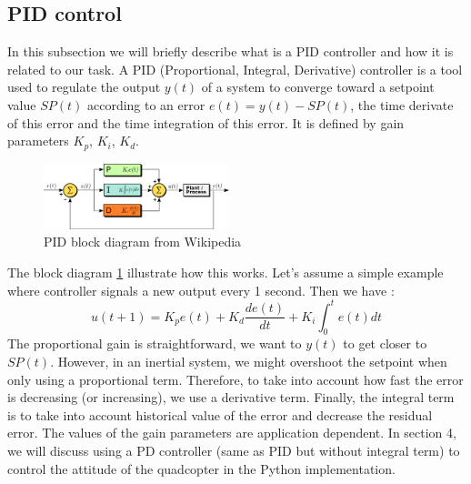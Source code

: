 \subsection{PID control \cite{johnson2005pid}}
In this subsection we will briefly describe what is a PID controller and how it is related to our task.
A PID (Proportional, Integral, Derivative) controller is a tool used to regulate the output $y(t)$ of a system to converge toward a setpoint value $SP(t)$ according to an error $e(t)=y(t)-SP(t)$, the time derivate of this error and the time integration of this error. 
It is defined by gain parameters $K_p$, $K_i$, $K_d$. 
\begin{figure}[h!]
    \centering
    \includegraphics[width=0.48\textwidth]{Images/PID_en.svg.png}
    \caption{PID block diagram from Wikipedia}
    \label{fig:blockpid}
\end{figure}
The block diagram \ref{fig:blockpid} illustrate how this works. Let's assume a simple example where controller signals a new output every 1 second. 
Then we have : 
\begin{equation}
    u(t+1) = K_p e(t) + K_d \frac{de(t)}{dt} + K_i\int_0^te(t)dt
    \label{eqn:pid}
\end{equation}
The proportional gain is straightforward, we want to $y(t)$ to get closer to $SP(t)$.
However, in an inertial system, we might overshoot the setpoint when only using a proportional term. Therefore, to take into account how fast the error is decreasing (or increasing), we use a derivative term.
Finally, the integral term is to take into account historical value of the error and decrease the residual error.
The values of the gain parameters are application dependent.
In section 4, we will discuss using a PD controller (same as PID but without integral term) to control the attitude of the quadcopter in the Python implementation.
